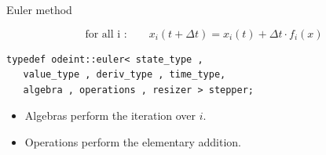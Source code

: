 







\begin{frame}[fragile]


 \vspace{2ex}

Euler method

$$\text{for all i :}  \quad \quad x_i(t+\Delta t) = x_i(t) + \Delta t \cdot f_i(x)$$

\vspace{2ex}

\begin{lstlisting}
typedef odeint::euler< state_type ,
   value_type , deriv_type , time_type,
   algebra , operations , resizer > stepper; 
\end{lstlisting}


\begin{itemize}
\item Algebras perform the iteration over $i$.
\item Operations perform the elementary addition.
\end{itemize}


\end{frame}












